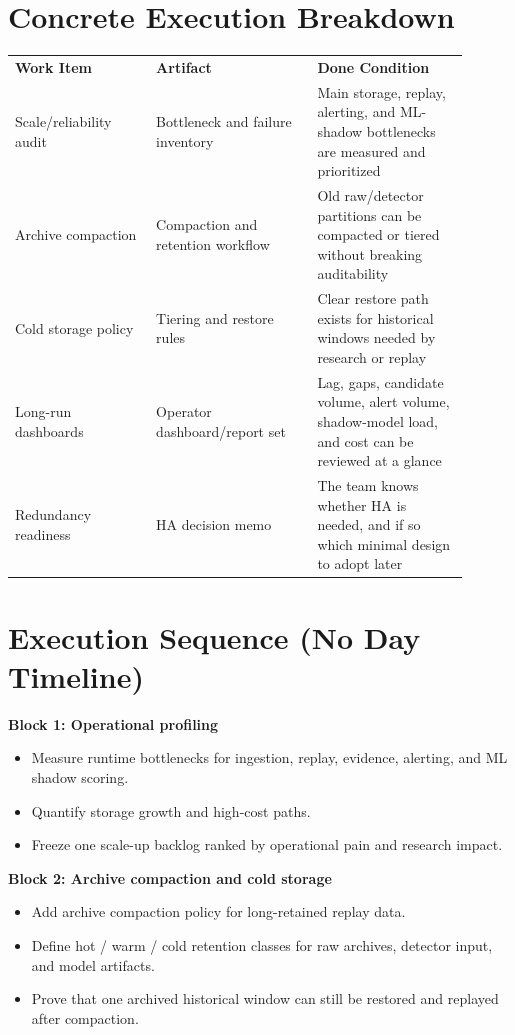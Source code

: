 \documentclass{article}
\begin{document}
\section*{Concrete Execution Breakdown}
\begin{longtable}{p{0.28\linewidth}p{0.32\linewidth}p{0.30\linewidth}}
\textbf{Work Item} & \textbf{Artifact} & \textbf{Done Condition} \\
Scale/reliability audit & Bottleneck and failure inventory & Main storage, replay, alerting, and ML-shadow bottlenecks are measured and prioritized \\
Archive compaction & Compaction and retention workflow & Old raw/detector partitions can be compacted or tiered without breaking auditability \\
Cold storage policy & Tiering and restore rules & Clear restore path exists for historical windows needed by research or replay \\
Long-run dashboards & Operator dashboard/report set & Lag, gaps, candidate volume, alert volume, shadow-model load, and cost can be reviewed at a glance \\
Redundancy readiness & HA decision memo & The team knows whether HA is needed, and if so which minimal design to adopt later \\
\end{longtable}

\section*{Execution Sequence (No Day Timeline)}
\textbf{Block 1: Operational profiling}
\begin{itemize}
\item Measure runtime bottlenecks for ingestion, replay, evidence, alerting, and ML shadow scoring.
\item Quantify storage growth and high-cost paths.
\item Freeze one scale-up backlog ranked by operational pain and research impact.
\end{itemize}

\textbf{Block 2: Archive compaction and cold storage}
\begin{itemize}
\item Add archive compaction policy for long-retained replay data.
\item Define hot / warm / cold retention classes for raw archives, detector input, and model artifacts.
\item Prove that one archived historical window can still be restored and replayed after compaction.
\end{itemize}
\end{document}
